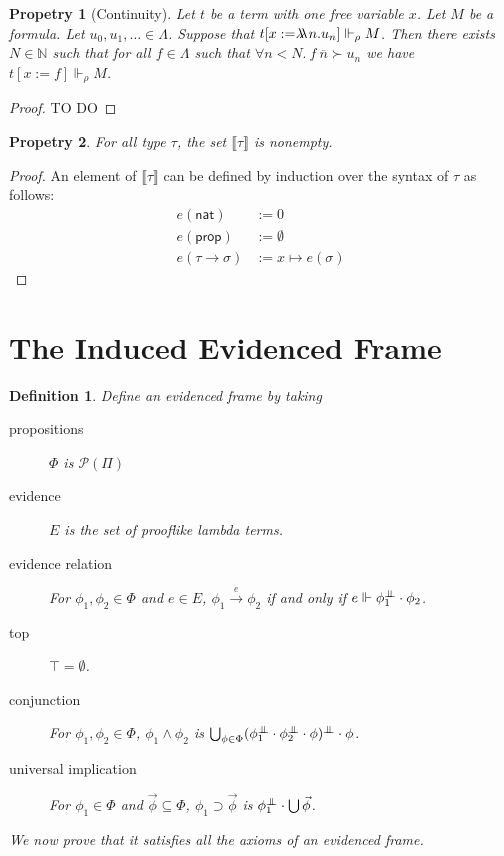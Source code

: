 \documentclass{article}
\newcommand{\N}{\mathbb{N}}
\newcommand{\nat}{\mathsf{nat}}
\newcommand{\pole}{{\bot\mkern-10mu\bot}}
\newcommand{\realizes}{\Vdash}
\newcommand{\oracle}[2]{\lambda\mkern-15mu\lambda\ #1. #2}
\newcommand{\prop}{\mathsf{prop}}
\newcommand{\typeinterp}[1]{{\llbracket #1 \rrbracket}}
\newcommand{\powerset}[1]{\mathcal{P}(#1)}
\newtheorem{definition}{Definition}
\newtheorem{property}{Propetry}
\begin{document}
\begin{property}[Continuity]
    Let $t$ be a term with one free variable $x$.
    Let $M$ be a formula.
    Let $u_0, u_1, \dots \in \Lambda$.
    Suppose that $t[x := \oracle{n}{u_n}] \realizes_\rho M$.
    Then there exists $N \in \N$ such that for all $f \in \Lambda$ such that $\forall n < N.\ f\ \overline{n} \succ u_n$ we have $t[x := f] \realizes_\rho M$.
\end{property}

\begin{proof}
    TO DO
\end{proof}

\begin{property}\label{typeinterpnonempty}
    For all type $\tau$, the set $\typeinterp{\tau}$ is nonempty.
\end{property}

\begin{proof}
    An element of $\typeinterp{\tau}$ can be defined by induction over the syntax of $\tau$ as follows:
    \begin{align*}
        e(\nat) & := 0 \\
        e(\prop) & := \emptyset \\
        e(\tau \rightarrow \sigma) & := x \mapsto e(\sigma)
    \end{align*}
\end{proof}

\section{The Induced Evidenced Frame}

\begin{definition}
    Define an evidenced frame by taking
    \begin{description}
        \item[propositions] $\Phi$ is $\powerset{\Pi}$
        \item[evidence] $E$ is the set of prooflike lambda terms.
        \item[evidence relation] For $\phi_1, \phi_2 \in \Phi$ and $e \in E$, $\phi_1 \xrightarrow{e} \phi_2$ if and only if $e \realizes \phi_1^\pole \cdot \phi_2$.
        \item[top] $\top = \emptyset$.
        \item[conjunction] For $\phi_1, \phi_2 \in \Phi$, $\phi_1 \wedge \phi_2$ is $\bigcup_{\phi \in \Phi} (\phi_1^\pole \cdot \phi_2^\pole \cdot \phi)^\pole \cdot \phi$.
        \item[universal implication] For $\phi_1 \in \Phi$ and $\vec\phi \subseteq \Phi$, $\phi_1 \supset \vec\phi$ is $\phi_1^\pole \cdot \bigcup \vec\phi$.
    \end{description}
     
    We now prove that it satisfies all the axioms of an evidenced frame.
\end{definition}
\end{document}
